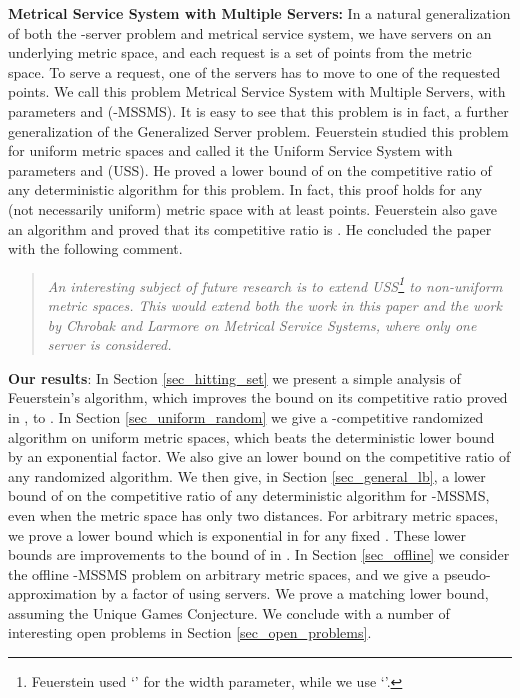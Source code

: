 \documentclass[11pt]{article}
\theoremstyle{plain}\newtheorem{theorem}{Theorem}
\theoremstyle{definition}
\theoremstyle{remark}
\begin{document}
\noindent
\textbf{Metrical Service System with Multiple Servers:} In a natural generalization of both the -server problem and metrical service system, we have  servers on an underlying metric space, and each request is a set of  points from the metric space. To serve a request, one of the  servers has to move to one of the  requested points. We call this problem Metrical Service System with Multiple Servers, with parameters  and  (-MSSMS). It is easy to see that this problem is in fact, a further generalization of the Generalized Server problem. Feuerstein \cite{Feuerstein98} studied this problem for uniform metric spaces and called it the Uniform Service System with parameters  and  (USS). He proved a lower bound of  on the competitive ratio of any deterministic algorithm for this problem. In fact, this proof holds for any (not necessarily uniform) metric space with at least  points. Feuerstein also gave an algorithm and proved that its competitive ratio is . He concluded the paper with the following comment.
\begin{quote}
\textit{An interesting subject of future research is to extend USS\footnote{Feuerstein used `' for the width parameter, while we use `'.} to non-uniform metric spaces. This would extend both the work in this paper and the work by Chrobak and Larmore \cite{ChrobakL92} on Metrical Service Systems, where only one server is considered.}
\end{quote}









\noindent
\textbf{Our results}: In Section \ref{sec_hitting_set} we present a simple analysis of Feuerstein's algorithm, which improves the bound on its competitive ratio proved in \cite{Feuerstein98}, to . In Section \ref{sec_uniform_random} we give a -competitive randomized algorithm 
on uniform metric spaces, which beats the deterministic lower bound by an exponential factor. We also give an  lower bound on the competitive ratio of any randomized algorithm. 
We then give, in Section \ref{sec_general_lb}, a lower bound of  on the competitive ratio of any deterministic algorithm for -MSSMS, even when the metric space has only two distances. For arbitrary metric spaces, we prove a lower bound which is exponential in  for any fixed .
These lower bounds are improvements to the bound of  in \cite{Feuerstein98}. In Section \ref{sec_offline} we consider the offline -MSSMS problem on arbitrary metric spaces, and we give a pseudo-approximation by a factor of  using  servers. We prove a matching lower bound, assuming the Unique Games Conjecture. We conclude with a number of interesting open problems in Section \ref{sec_open_problems}. 
\end{document}
